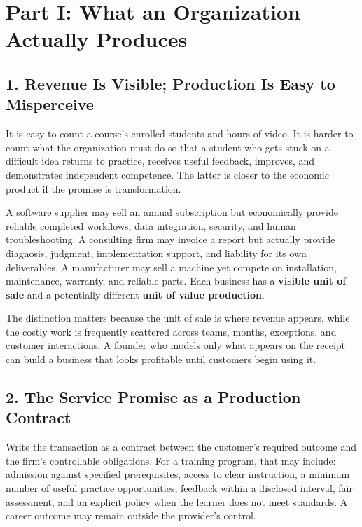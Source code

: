 \section*{Part I: What an Organization Actually Produces}

\subsection*{1. Revenue Is Visible; Production Is Easy to Misperceive}

It is easy to count a course's enrolled students and hours of video. It is harder to count what the organization must do so that a student who gets stuck on a difficult idea returns to practice, receives useful feedback, improves, and demonstrates independent competence. The latter is closer to the economic product if the promise is transformation.

A software supplier may sell an annual subscription but economically provide reliable completed workflows, data integration, security, and human troubleshooting. A consulting firm may invoice a report but actually provide diagnosis, judgment, implementation support, and liability for its own deliverables. A manufacturer may sell a machine yet compete on installation, maintenance, warranty, and reliable parts. Each business has a \textbf{visible unit of sale} and a potentially different \textbf{unit of value production}.

The distinction matters because the unit of sale is where revenue appears, while the costly work is frequently scattered across teams, months, exceptions, and customer interactions. A founder who models only what appears on the receipt can build a business that looks profitable until customers begin using it.

\subsection*{2. The Service Promise as a Production Contract}

Write the transaction as a contract between the customer's required outcome and the firm's controllable obligations. For a training program, that may include: admission against specified prerequisites, access to clear instruction, a minimum number of useful practice opportunities, feedback within a disclosed interval, fair assessment, and an explicit policy when the learner does not meet standards. A career outcome may remain outside the provider's control.

